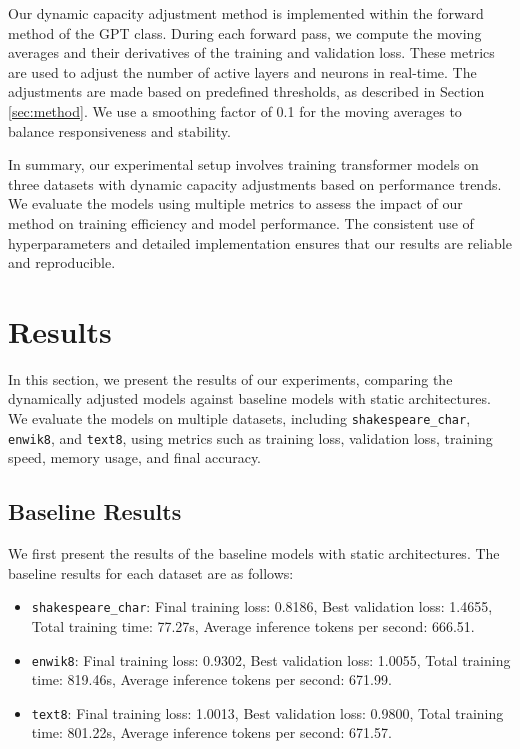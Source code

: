 \documentclass{article} %
\begin{document}
Our dynamic capacity adjustment method is implemented within the forward method of the GPT class. During each forward pass, we compute the moving averages and their derivatives of the training and validation loss. These metrics are used to adjust the number of active layers and neurons in real-time. The adjustments are made based on predefined thresholds, as described in Section \ref{sec:method}. We use a smoothing factor of 0.1 for the moving averages to balance responsiveness and stability.

In summary, our experimental setup involves training transformer models on three datasets with dynamic capacity adjustments based on performance trends. We evaluate the models using multiple metrics to assess the impact of our method on training efficiency and model performance. The consistent use of hyperparameters and detailed implementation ensures that our results are reliable and reproducible.

\section{Results}
\label{sec:results}
In this section, we present the results of our experiments, comparing the dynamically adjusted models against baseline models with static architectures. We evaluate the models on multiple datasets, including \texttt{shakespeare\_char}, \texttt{enwik8}, and \texttt{text8}, using metrics such as training loss, validation loss, training speed, memory usage, and final accuracy.

\subsection{Baseline Results}
We first present the results of the baseline models with static architectures. The baseline results for each dataset are as follows:
\begin{itemize}
    \item \texttt{shakespeare\_char}: Final training loss: 0.8186, Best validation loss: 1.4655, Total training time: 77.27s, Average inference tokens per second: 666.51.
    \item \texttt{enwik8}: Final training loss: 0.9302, Best validation loss: 1.0055, Total training time: 819.46s, Average inference tokens per second: 671.99.
    \item \texttt{text8}: Final training loss: 1.0013, Best validation loss: 0.9800, Total training time: 801.22s, Average inference tokens per second: 671.57.
\end{itemize}
\end{document}
